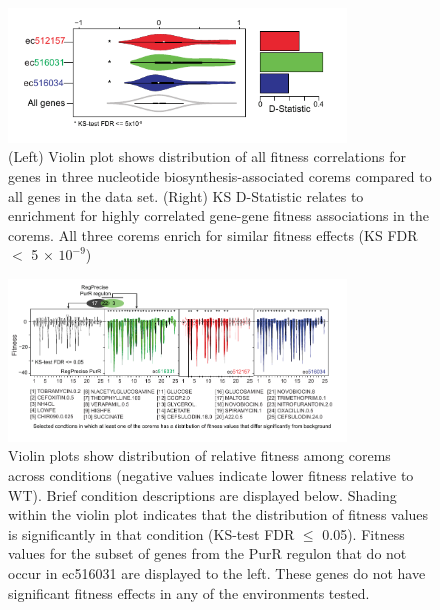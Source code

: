 \begin{figure}[h!]
    \centering
    \includegraphics[width=0.8\textwidth]{figures/purR_corem_fitness}
 	\caption[Genes from corems related to nucleotide biosynthesis have highly similar fitness effects when they are deleted]{(Left) Violin plot shows distribution of all fitness correlations for genes in three nucleotide biosynthesis-associated corems compared to all genes in the data set. (Right) KS D-Statistic relates to enrichment for highly correlated gene-gene fitness associations in the corems. All three corems enrich for similar fitness effects (KS FDR $<$ 5 × $10^{−9}$)
}
    \label{fig:purR_corem_fitness}
\end{figure}

\begin{figure}[h!]
    \centering
    \includegraphics[width=0.8\textwidth]{figures/purR_corem_fitness_specific}
 	\caption[Corems model fitness effects that occur in specific environments]{Violin plots show distribution of relative fitness among corems across conditions (negative values indicate lower fitness relative to WT). Brief condition descriptions are displayed below. Shading within the violin plot indicates that the distribution of fitness values is significantly in that condition (KS-test FDR $\leq$ 0.05). Fitness values for the subset of genes from the PurR regulon that do not occur in ec516031 are displayed to the left. These genes do not have significant fitness effects in any of the environments tested.
}
    \label{fig:purR_corem_fitness_specific}
\end{figure}

